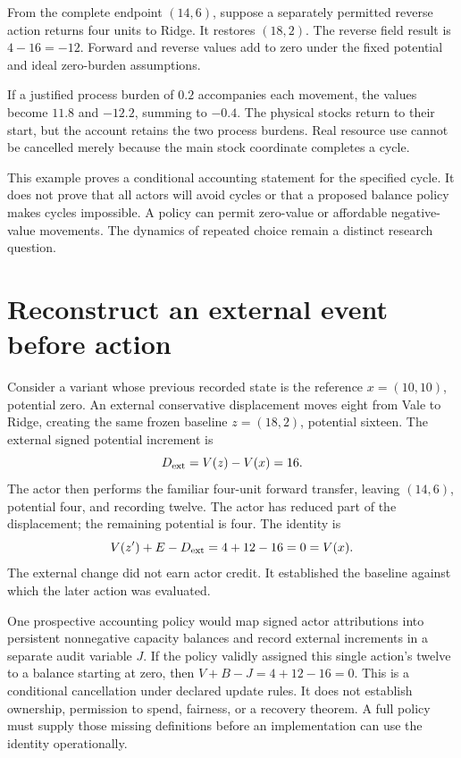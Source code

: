 From the complete endpoint \((14,6)\), suppose a separately permitted reverse action returns four units to Ridge. It restores \((18,2)\). The reverse field result is \(4-16=-12\). Forward and reverse values add to zero under the fixed potential and ideal zero-burden assumptions.

If a justified process burden of \(0.2\) accompanies each movement, the values become \(11.8\) and \(-12.2\), summing to \(-0.4\). The physical stocks return to their start, but the account retains the two process burdens. Real resource use cannot be cancelled merely because the main stock coordinate completes a cycle.

This example proves a conditional accounting statement for the specified cycle. It does not prove that all actors will avoid cycles or that a proposed balance policy makes cycles impossible. A policy can permit zero-value or affordable negative-value movements. The dynamics of repeated choice remain a distinct research question.

\section{Reconstruct an external event before action}

Consider a variant whose previous recorded state is the reference \(x=(10,10)\), potential zero. An external conservative displacement moves eight from Vale to Ridge, creating the same frozen baseline \(z=(18,2)\), potential sixteen. The external signed potential increment is
\begin{equation}
D_{\rm ext}=V(z)-V(x)=16.
\end{equation}
The actor then performs the familiar four-unit forward transfer, leaving \((14,6)\), potential four, and recording twelve. The actor has reduced part of the displacement; the remaining potential is four. The identity is
\begin{equation}
V(z')+E-D_{\rm ext}=4+12-16=0=V(x).
\end{equation}
The external change did not earn actor credit. It established the baseline against which the later action was evaluated.

One prospective accounting policy would map signed actor attributions into persistent nonnegative capacity balances and record external increments in a separate audit variable \(J\). If the policy validly assigned this single action's twelve to a balance starting at zero, then \(V+B-J=4+12-16=0\). This is a conditional cancellation under declared update rules. It does not establish ownership, permission to spend, fairness, or a recovery theorem. A full policy must supply those missing definitions before an implementation can use the identity operationally.

